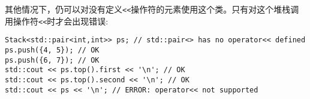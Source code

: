 其他情况下，仍可以对没有定义\texttt{<<}操作符的元素使用这个类。只有对这个堆栈调用操作符\texttt{<<}时才会出现错误:

\begin{lstlisting}[style=styleCXX]
Stack<std::pair<int,int>> ps; // std::pair<> has no operator<< defined
ps.push({4, 5}); // OK
ps.push({6, 7}); // OK
std::cout << ps.top().first << '\n'; // OK
std::cout << ps.top().second << '\n'; // OK
std::cout << ps << '\n'; // ERROR: operator<< not supported
\end{lstlisting}




